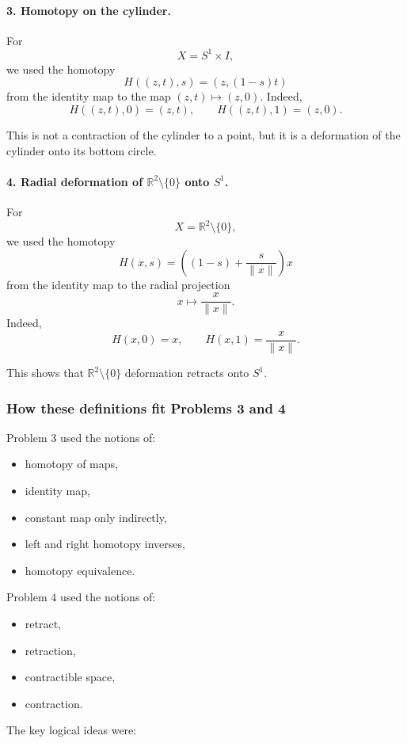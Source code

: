 \documentclass[12pt,a4paper]{article}
\theoremstyle{notespace}
\begin{document}
\paragraph{3. Homotopy on the cylinder.}
For
\[
X=S^1\times I,
\]
we used the homotopy
\[
H((z,t),s)=(z,(1-s)t)
\]
from the identity map to the map \((z,t)\mapsto (z,0)\). Indeed,
\[
H((z,t),0)=(z,t),
\qquad
H((z,t),1)=(z,0).
\]

This is not a contraction of the cylinder to a point, but it is a deformation of the cylinder onto its bottom circle.

\paragraph{4. Radial deformation of \(\mathbb{R}^2\setminus\{0\}\) onto \(S^1\).}
For
\[
X=\mathbb{R}^2\setminus\{0\},
\]
we used the homotopy
\[
H(x,s)=\left((1-s)+\frac{s}{\|x\|}\right)x
\]
from the identity map to the radial projection
\[
x\mapsto \frac{x}{\|x\|}.
\]
Indeed,
\[
H(x,0)=x,
\qquad
H(x,1)=\frac{x}{\|x\|}.
\]

This shows that \(\mathbb{R}^2\setminus\{0\}\) deformation retracts onto \(S^1\).

\subsubsection{How these definitions fit Problems 3 and 4}

Problem \(3\) used the notions of:

\begin{itemize}
	\item homotopy of maps,
	\item identity map,
	\item constant map only indirectly,
	\item left and right homotopy inverses,
	\item homotopy equivalence.
\end{itemize}

Problem \(4\) used the notions of:

\begin{itemize}
	\item retract,
	\item retraction,
	\item contractible space,
	\item contraction.
\end{itemize}

The key logical ideas were:
\end{document}
